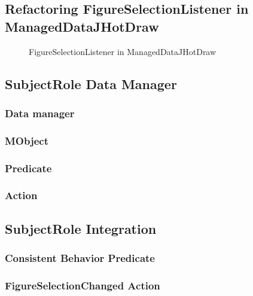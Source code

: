 \subsection{Refactoring FigureSelectionListener in ManagedDataJHotDraw}

\begin{figure}[H]
	\centering
  	\caption{FigureSelectionListener in ManagedDataJHotDraw}
  	\label{fig:JHotDraw_FigureSelectionListener_MD}
\end{figure}

\subsection{SubjectRole Data Manager}
\subsubsection{Data manager}
\subsubsection{MObject}
\subsubsection{Predicate}
\subsubsection{Action}

\subsection{SubjectRole Integration}
\subsubsection{Consistent Behavior Predicate}
\subsubsection{FigureSelectionChanged Action}


